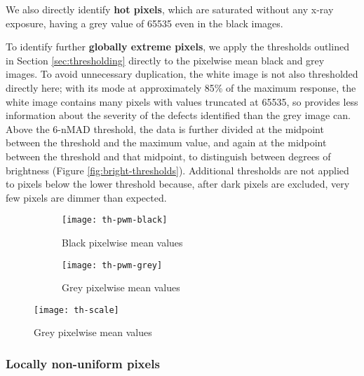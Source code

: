 \documentclass[\main/IO-Pixels.tex]{subfiles}
\begin{document}
We also directly identify \textbf{hot pixels}, which are saturated without any x-ray exposure, having a grey value of 65535 even in the black images.

To identify further \textbf{globally extreme pixels}, we apply the thresholds outlined in Section \ref{sec:thresholding} directly to the pixelwise mean black and grey images. To avoid unnecessary duplication, the white image is not also thresholded directly here; with its mode at approximately 85\% of the maximum response, the white image contains many pixels with values truncated at 65535, so provides less information about the severity of the defects identified than the grey image can. Above the 6-nMAD threshold, the data is further divided at the midpoint between the threshold and the maximum value, and again at the midpoint between the threshold and that midpoint, to distinguish between degrees of brightness (Figure \ref{fig:bright-thresholds}). Additional thresholds are not applied to pixels below the lower threshold because, after dark pixels are excluded, very few pixels are dimmer than expected.

\begin{figure}[!ht]
    \caption{Thresholding of black \& grey pixelwise mean values. Images taken on Nikon loan panel on 16-07-19.}
    \label{fig:bright-thresholds}
    
    \centering

    \begin{subfigure}[!]{0.49\textwidth}
    \caption{Black pixelwise mean values}
    \texttt{[image: th-pwm-black]}
    \end{subfigure}
    \begin{subfigure}[!]{0.49\textwidth}
    \caption{Grey pixelwise mean values}
    \texttt{[image: th-pwm-grey]}
    \end{subfigure}
    
    \vspace{12pt}
    \texttt{[image: th-scale]}

\end{figure}

\subsubsection{Locally non-uniform pixels}
\end{document}
